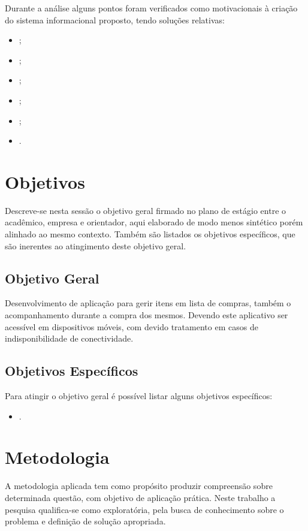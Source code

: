 \documentclass[
	draft,
	12pt,
	openright,
	oneside, %
	a4paper,
	chapter=TITLE,
	section=TITLE,
	english,
	brazil %
	]{abntex2-udesc}
\begin{document}
Durante a análise alguns pontos foram verificados como motivacionais à criação do sistema informacional proposto, tendo soluções relativas:

\begin{itemize}
\item ;
\item ;
\item ;
\item ;
\item ;
\item .
\end{itemize}

\section{Objetivos}

Descreve-se nesta sessão o objetivo geral firmado no plano de estágio entre o acadêmico, empresa e orientador, aqui elaborado de modo menos sintético porém alinhado ao mesmo contexto. Também são listados os objetivos específicos, que são inerentes ao atingimento deste objetivo geral.

\subsection{Objetivo Geral}

Desenvolvimento de aplicação para gerir itens em lista de compras, também o acompanhamento durante a compra dos mesmos. Devendo este aplicativo ser acessível em dispositivos móveis, com devido tratamento em casos de indisponibilidade de conectividade.

\subsection{Objetivos Específicos}

Para atingir o objetivo geral é possível listar alguns objetivos específicos:

\begin{itemize}
\item .
\end{itemize}

\section{Metodologia}

A metodologia aplicada tem como propósito produzir compreensão sobre determinada questão, com objetivo de aplicação prática. Neste trabalho a pesquisa qualifica-se como exploratória, pela busca de conhecimento sobre o problema e definição de solução apropriada.
\end{document}
